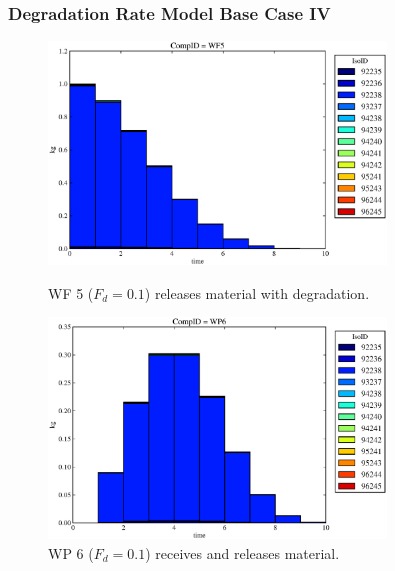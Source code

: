 \begin{frame}
  \frametitle{Degradation Rate Model Base Case IV}
  \begin{figure}
\begin{minipage}[b]{0.45\linewidth}

  \includegraphics[width=0.8\textwidth]{./images/drIV1.eps}
  \caption[DRIV WF Contaminants.]{
    WF 5 ($F_d = 0.1$) releases material with degradation. 
    }
  \label{fig:drIVwf5}
  
  \includegraphics[width=0.8\textwidth]{./images/drIV2.eps}
  \caption[Case DRIV WP Contaminants.]{ 
    WP 6 ($F_d = 0.1$) receives and releases material. 
    }
  \label{fig:drIVwp6}

\end{minipage}
\hspace{0.05\linewidth}
\begin{minipage}[b]{0.45\linewidth}


\end{minipage}
\end{figure}
\end{frame}
